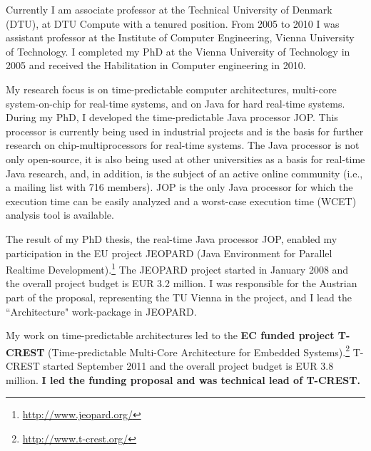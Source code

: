 \documentclass[%
    a4paper,
    11pt, %
    headinclude, footexclude,
    notitlepage,
    headsepline,
    pointlessnumbers,
    ]{scrartcl}
\begin{document}
\clearpage


Currently I am associate professor at the Technical University of Denmark (DTU), at
DTU Compute with a tenured position.
From 2005 to 2010 I was assistant professor at the Institute of Computer Engineering, Vienna
University of Technology.
I completed my PhD at the Vienna University of Technology in 2005 and
received the Habilitation in Computer engineering in 2010.


My research focus is on time-predictable computer architectures,
multi-core system-on-chip for real-time systems, and
on Java for hard real-time systems. During my PhD, I developed the
time-predictable Java processor JOP. This processor is currently
being used in industrial projects and is the basis for further
research on chip-multiprocessors for real-time systems. The Java
processor is not only open-source, it is also being used at other
universities as a basis for real-time Java research, and, in
addition, is the subject of an active online community (i.e., a
mailing list with 716 members). JOP is the only Java processor for
which the execution time can be easily analyzed and a worst-case
execution time (WCET) analysis tool is available.

The result of my PhD thesis, the real-time Java processor JOP,
enabled my participation in the EU project JEOPARD (Java Environment
for Parallel Realtime
Development).\footnote{\url{http://www.jeopard.org/}} The JEOPARD
project started in January 2008 and the overall project budget is EUR
3.2 million.
I was responsible for the Austrian part of the proposal, representing the
TU Vienna in the project, and I lead the ``Architecture"
work-package in JEOPARD.

My work on time-predictable architectures led to the \textbf{EC funded project
T-CREST} (Time-predictable Multi-Core Architecture for Embedded
Systems).\footnote{\url{http://www.t-crest.org/}}
T-CREST started September 2011 and the overall project budget
is EUR 3.8 million. \textbf{I led the funding proposal and was technical lead of
T-CREST.}
\end{document}
